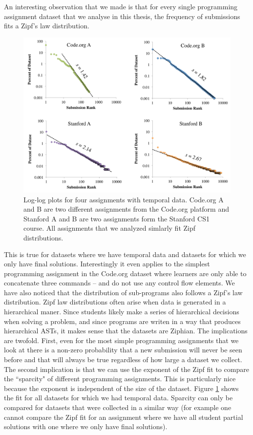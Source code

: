 An interesting observation that we made is that for every single programming assignment dataset that we analyse in this thesis, the frequency of submissions fits a Zipf's law distribution. 
\begin{figure}[ht]
\center
\includegraphics[width=1.0\textwidth]{img/zipfAll}
\caption[Submission Sparcity]{
Log-log plots for four assignments with temporal data. Code.org A and B are two different assignments from the Code.org platform and Stanford A and B are two assignments form the Stanford CS1 course. All assignments that we analyzed simlarly fit Zipf distributions.
}
\label{fig:zipfAll}
\end{figure}
This is true for datasets where we have temporal data and datasets for which we only have final solutions. Interestingly it even applies to the simplest programming assignment in the Code.org dataset where learners are only able to concatenate three commands -- and do not use any control flow elements. We have also noticed that the distribution of sub-programs also follows a Zipf's law distribution. Zipf law distributions often arise when data is generated in a hierarchical maner. Since students likely make a series of hierarchical decisions when solving a problem, and since programs are writen in a way that produces hierarchical ASTs, it makes sense that the datasets are Ziphian. The implications are twofold. First, even for the most simple programming assignments that we look at there is a non-zero probability that a new submission will never be seen before and that will always be true regardless of how large a dataset we collect. The second implication is that we can use the exponent of the Zipf fit to compare the ``sparcity" of different programming assignments. This is particularly nice because the exponent is independent of the size of the dataset. Figure \ref{fig:zipfAll} shows the fit for all datasets for which we had temporal data. Sparcity can only be compared for datasets that were collected in a similar way (for example one cannot compare the Zipf fit for an assignment where we have all student partial solutions with one where we only have final solutions).

